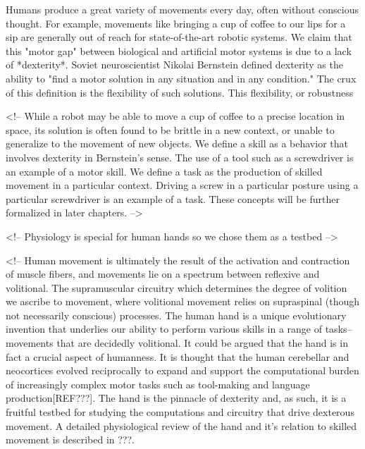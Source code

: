 \documentclass[../main.tex]{subfiles}
\begin{document}
Humans produce a great variety of movements every day, often without conscious thought. For example, movements like bringing a cup of coffee to our lips for a sip are generally out of reach for state-of-the-art robotic systems. We claim that this "motor gap" between biological and artificial motor systems is due to a lack of *dexterity*. Soviet neuroscientist Nikolai Bernstein defined dexterity as the ability to "find a motor solution in any situation and in any condition."\cite{Bernstein1967} The crux of this definition is the flexibility of such solutions. This flexibility, or robustness

<!-- While a robot may be able to move a cup of coffee to a precise location in space, its solution is often found to be brittle in a new context, or unable to generalize to the movement of new objects. We define a skill as a behavior that involves dexterity in Bernstein's sense. The use of a tool such as a screwdriver is an example of a motor skill. We define a task as the production of skilled movement in a particular context. Driving a screw in a particular posture using a particular screwdriver is an example of a task. These concepts will be further formalized in later chapters.  -->

<!-- Physiology is special for human hands so we chose them as a testbed -->

<!-- Human movement is ultimately the result of the activation and contraction of muscle fibers, and movements lie on a spectrum between reflexive and volitional. The supramuscular circuitry which determines the degree of volition we ascribe to movement, where volitional movement relies on supraspinal (though not necessarily conscious) processes. The human hand is a unique evolutionary invention that underlies our ability to perform various skills in a range of tasks-- movements that are decidedly volitional. It could be argued that the hand is in fact a crucial aspect of humanness. It is thought that the human cerebellar and neocortices evolved reciprocally to expand and support the computational burden of increasingly complex motor tasks such as tool-making and language production[REF???]. The hand is the pinnacle of dexterity and, as such, it is a fruitful testbed for studying the computations and circuitry that drive dexterous movement. A detailed physiological review of the hand and it's relation to skilled movement is described in ???.
\end{document}
